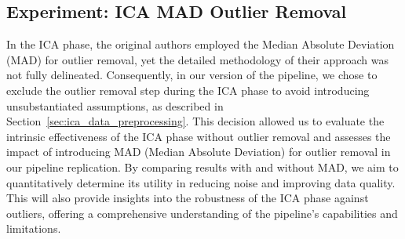 \subsection{Experiment: ICA MAD Outlier Removal}\label{sec:experiment_ica_mad_outlier_removal}
In the ICA phase, the original authors employed the Median Absolute Deviation (MAD) for outlier removal, yet the detailed methodology of their approach was not fully delineated.
Consequently, in our version of the pipeline, we chose to exclude the outlier removal step during the ICA phase to avoid introducing unsubstantiated assumptions, as described in Section~\ref{sec:ica_data_preprocessing}.
This decision allowed us to evaluate the intrinsic effectiveness of the ICA phase without outlier removal and assesses the impact of introducing MAD (Median Absolute Deviation) for outlier removal in our pipeline replication. 
By comparing results with and without MAD, we aim to quantitatively determine its utility in reducing noise and improving data quality. 
This will also provide insights into the robustness of the ICA phase against outliers, offering a comprehensive understanding of the pipeline's capabilities and limitations.